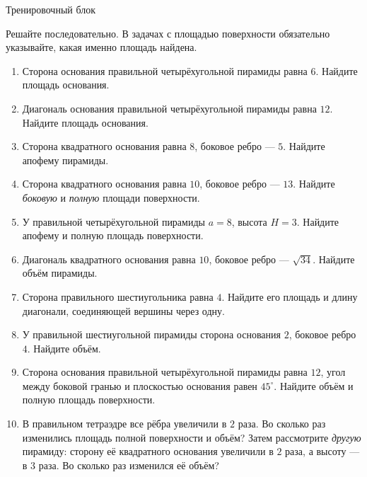 \documentclass[a4paper,12pt]{article}
\begin{document}
\begin{center}{\Large\color{darkaccent} Тренировочный блок}\par
\vspace{2mm}{\normalsize Путь А --- 10 задач от простого к сложному}\end{center}
\smallskip
Решайте последовательно. В задачах с площадью поверхности обязательно указывайте, какая именно площадь найдена.
\begin{enumerate}
\item Сторона основания правильной четырёхугольной пирамиды равна \(6\). Найдите площадь основания.
\item Диагональ основания правильной четырёхугольной пирамиды равна \(12\). Найдите площадь основания.
\item Сторона квадратного основания равна \(8\), боковое ребро --- \(5\). Найдите апофему пирамиды.
\item Сторона квадратного основания равна \(10\), боковое ребро --- \(13\). Найдите \emph{боковую} и \emph{полную} площади поверхности.
\item У правильной четырёхугольной пирамиды \(a=8\), высота \(H=3\). Найдите апофему и полную площадь поверхности.
\item Диагональ квадратного основания равна \(10\), боковое ребро --- \(\sqrt{34}\). Найдите объём пирамиды.
\item Сторона правильного шестиугольника равна \(4\). Найдите его площадь и длину диагонали, соединяющей вершины через одну.
\item У правильной шестиугольной пирамиды сторона основания \(2\), боковое ребро \(4\). Найдите объём.
\item Сторона основания правильной четырёхугольной пирамиды равна \(12\), угол между боковой гранью и плоскостью основания равен \(45^\circ\). Найдите объём и полную площадь поверхности.
\item В правильном тетраэдре все рёбра увеличили в \(2\) раза. Во сколько раз изменились площадь полной поверхности и объём? Затем рассмотрите \emph{другую} пирамиду: сторону её квадратного основания увеличили в \(2\) раза, а высоту --- в \(3\) раза. Во сколько раз изменился её объём?
\end{enumerate}
\end{document}
